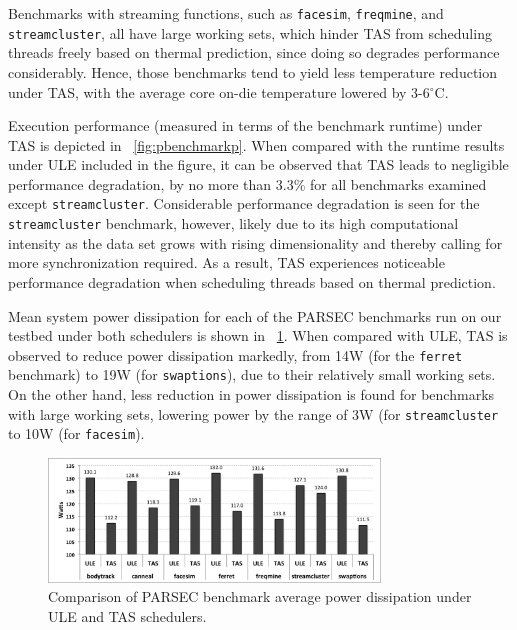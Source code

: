 \documentclass[times, 10pt,twocolumn]{IEEEtran}
\begin{document}
Benchmarks with streaming functions, such as \texttt{facesim},
\texttt{freqmine}, and \texttt{streamcluster}, all have large working
sets, which hinder TAS from scheduling threads freely based on thermal
prediction, since doing so degrades performance considerably.  Hence,
those benchmarks tend to yield less temperature reduction under TAS,
with the average core on-die temperature lowered by 3-6$^{\circ}$C.  

Execution performance (measured in terms of the benchmark runtime) under
TAS is depicted in \figurename~\ref{fig:pbenchmarkp}.  When compared
with the runtime results under ULE included in the figure, it can be
observed that TAS leads to negligible performance degradation, by no
more than 3.3\% for all benchmarks examined except
\texttt{streamcluster}.  Considerable performance degradation is seen
for the \texttt{streamcluster} benchmark, however, likely due to its high
computational intensity as the data set grows with rising dimensionality
and thereby calling for more synchronization required.  As a result, TAS
experiences noticeable performance degradation when scheduling threads
based on thermal prediction.

Mean system power dissipation for each of the PARSEC benchmarks run on
our testbed under both schedulers is shown in
\figurename~\ref{fig:pbenchmark}.  When compared with ULE, TAS is
observed to reduce power dissipation markedly, from 14W (for the 
\texttt{ferret} benchmark) to 19W (for \texttt{swaptions}), due to their
relatively small working sets.  On the other hand, less reduction in
power dissipation is found for benchmarks with large working sets,
lowering power by the range of 3W (for \texttt{streamcluster} to 10W
(for \texttt{facesim}).
  
\begin{figure}[tbp]
  \includegraphics[width=1.0\linewidth,height=1.3in]{ParsecPowerConsumption.png}
  \caption{Comparison of PARSEC benchmark average power dissipation under ULE and TAS schedulers.}
  \label{fig:pbenchmark}
\end{figure}
\end{document}

